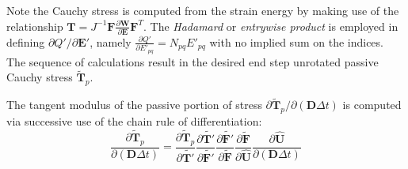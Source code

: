 Note the Cauchy stress is computed from the strain energy by making use of the relationship $\bm{T} = J^{-1}\bm{F}\frac{\partial\bm{W}}{\partial \bm{E}} \bm{F}^T$. The \textit{Hadamard} or \textit{entrywise product} is employed in defining ${\partial Q'}/{\partial \bm{E}'}$, namely $\frac{\partial Q'}{\partial E'_{pq}} = N_{pq}E'_{pq}$ with no implied sum on the indices. The sequence of calculations result in the desired end step unrotated passive Cauchy stress $\tilde{\bm{T}}_p$.

The tangent modulus of the passive portion of stress ${\partial \tilde{\bm{T}}_p}/{\partial (\bm{D}\Delta{t})}$ is computed via successive use of the chain rule of differentiation:
\begin{equation}
\frac{\partial \tilde{\bm{T}}_p}{\partial (\bm{D}\Delta{t})} = \frac{\partial \tilde{\bm{T}}_p}{\partial \tilde{\bm{T}'}}\frac{\partial \tilde{\bm{T}'}}{\partial \tilde{\bm{F}'}}\frac{\partial \tilde{\bm{F}'}}{\partial \tilde{\bm{F}}}\frac{\partial \tilde{\bm{F}}}{\partial \hat{\bm{U}}}\frac{\partial \hat{\bm{U}}}{\partial (\bm{D}\Delta{t})}
\label{eqn:tanmod}
\end{equation}


